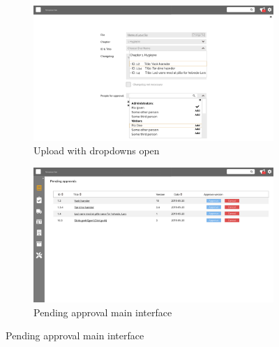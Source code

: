 \begin{figure}[H]\ContinuedFloat
	\centering
	\begin{subfigure}[b]{0.48\textwidth}
		\includegraphics[width=\textwidth]{billeder/iteration3Prototyper/Page_10.jpg}
		\caption{Upload with dropdowns open}
		\label{fig:5-Upload 3}
	\end{subfigure}
	\quad
	\begin{subfigure}[b]{0.48\textwidth}
		\includegraphics[width=\textwidth]{billeder/iteration3Prototyper/Page_18.jpg}
		\caption{Pending approval main interface}
		\label{fig:5-Approval1}
	\end{subfigure}
\end{figure}

